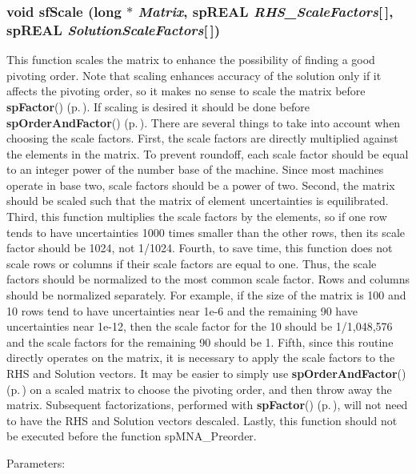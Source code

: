 \subsubsection{\setlength{\rightskip}{0pt plus 5cm}void sf\-Scale (long $\ast$ {\em Matrix}, sp\-REAL {\em RHS\_\-Scale\-Factors}[$\,$], sp\-REAL {\em Solution\-Scale\-Factors}[$\,$])}\label{spFortran_8c_a71}


This function scales the matrix to enhance the possibility of finding a good pivoting order. Note that scaling enhances accuracy of the solution only if it affects the pivoting order, so it makes no sense to scale the matrix before {\bf sp\-Factor}() {\rm (p.\,\pageref{spFactor_8c_a25})}. If scaling is desired it should be done before {\bf sp\-Order\-And\-Factor}() {\rm (p.\,\pageref{spFactor_8c_a24})}. There are several things to take into account when choosing the scale factors. First, the scale factors are directly multiplied against the elements in the matrix. To prevent roundoff, each scale factor should be equal to an integer power of the number base of the machine. Since most machines operate in base two, scale factors should be a power of two. Second, the matrix should be scaled such that the matrix of element uncertainties is equilibrated. Third, this function multiplies the scale factors by the elements, so if one row tends to have uncertainties 1000 times smaller than the other rows, then its scale factor should be 1024, not 1/1024. Fourth, to save time, this function does not scale rows or columns if their scale factors are equal to one. Thus, the scale factors should be normalized to the most common scale factor. Rows and columns should be normalized separately. For example, if the size of the matrix is 100 and 10 rows tend to have uncertainties near 1e-6 and the remaining 90 have uncertainties near 1e-12, then the scale factor for the 10 should be 1/1,048,576 and the scale factors for the remaining 90 should be 1. Fifth, since this routine directly operates on the matrix, it is necessary to apply the scale factors to the RHS and Solution vectors. It may be easier to simply use {\bf sp\-Order\-And\-Factor}() {\rm (p.\,\pageref{spFactor_8c_a24})} on a scaled matrix to choose the pivoting order, and then throw away the matrix. Subsequent factorizations, performed with {\bf sp\-Factor}() {\rm (p.\,\pageref{spFactor_8c_a25})}, will not need to have the RHS and Solution vectors descaled. Lastly, this function should not be executed before the function sp\-MNA\_\-Preorder.\begin{Desc}
\item[Parameters: ]\par

\end{Desc}
